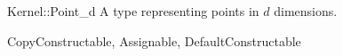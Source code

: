 \begin{ccRefConcept}{Kernel::Point_d}
A type representing points in $d$ dimensions.

\ccRefines
CopyConstructable, Assignable, DefaultConstructable

\ccSeeAlso
{} \\
 \\

\end{ccRefConcept}
